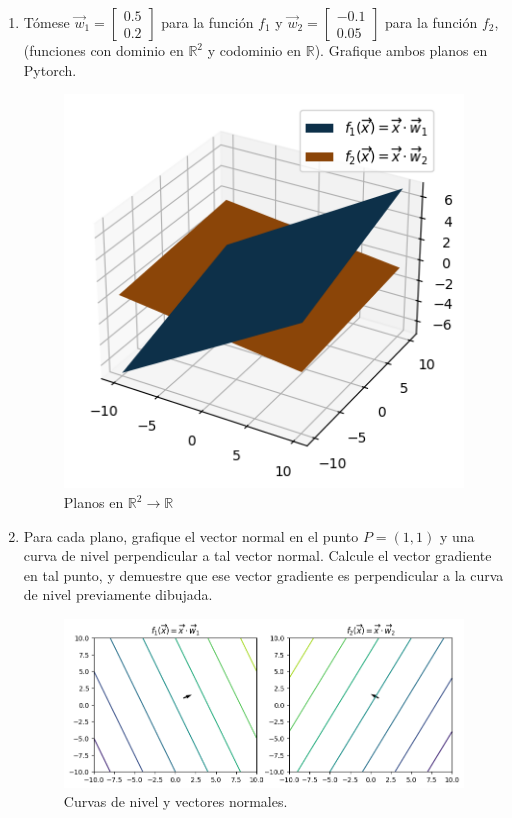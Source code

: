 \documentclass{article}
\begin{document}
\begin{enumerate}
\item Tómese $\overrightarrow{w}_1=\begin{bmatrix}0.5\\0.2\end{bmatrix}$ para la función $f_1$ y $\overrightarrow{w}_2=\begin{bmatrix}-0.1\\0.05\end{bmatrix}$ para la función $f_2$, (funciones con dominio en $\mathbb{R}^2$ y codominio en $\mathbb{R}$). Grafique ambos planos en Pytorch.

\begin{figure}[h]
\centering
\includegraphics[width=0.5\linewidth]{img/planes.png}
\caption{Planos en $\mathbb{R}^2\to\mathbb{R}$}
\label{fig:planes}
\end{figure}

\item Para cada plano, grafique el vector normal en el punto $P=(1,1)$ y una curva de nivel perpendicular a tal vector normal. Calcule el vector gradiente en tal punto, y demuestre que ese vector gradiente es perpendicular a la curva de nivel previamente dibujada.

\begin{figure}[h]
\centering
\includegraphics[width=\linewidth]{img/level_curves.png}
\caption{Curvas de nivel y vectores normales.}
\label{fig:level_curves}
\end{figure}


\end{enumerate}
\end{document}
